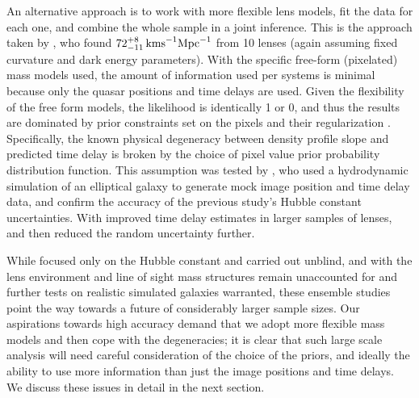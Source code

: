 An alternative approach is to work with more flexible lens models, fit
the data for each one, and combine the whole sample in a joint
inference.  This is the approach taken by \citet{Sah++06}, who found
$72^{+8}_{-11}\,{\rm km s}^{-1}{\rm Mpc}^{-1}$ from 10 lenses (again
assuming fixed curvature and dark energy parameters). With the
specific free-form (pixelated) mass models used, the amount of
information used per systems is minimal because only the quasar
positions and time delays are used. Given the flexibility of the free
form models, the likelihood is identically 1 or 0, and thus the
results are dominated by prior constraints set on the pixels and their
regularization \cite[see][for a description of pixel-lens in Bayesian
terms]{Col08}. Specifically, the known physical degeneracy between
density profile slope and predicted time delay
\citep{Wuc02,Suyu12} is broken by the choice of pixel value prior probability
distribution function. This assumption was tested by
\citet{Rea++07}, who used a hydrodynamic simulation of an elliptical
galaxy to generate mock image position and time delay data, and
confirm the accuracy of the previous study's Hubble constant
uncertainties. With improved time delay estimates in larger samples of
lenses, \cite{P+J10} and then \citet{RK++2015} reduced the random
uncertainty further.

While focused only on the Hubble constant and carried out unblind, and
with the lens environment and line of sight mass structures remain
unaccounted for and further tests on realistic simulated galaxies
warranted, these ensemble studies point the way towards a future of
considerably larger sample sizes. Our aspirations towards high accuracy
demand that we adopt more flexible mass models and then
cope with the degeneracies;
it is clear that such large
scale analysis will need careful consideration of the choice of the
priors, and ideally the ability to use more information than just the
image positions and time delays. We discuss these issues in detail in
the next section.
